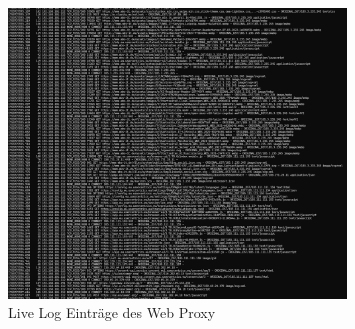 \documentclass[12pt]{scrreprt}
\begin{document}
\begin{thebibliography}{99}
\begin{figure}[htbp]
	\centering
	\includegraphics[width=0.8\textwidth]{squidproxy-log.png}
	\caption{Live Log Einträge des Web Proxy}
	\label{fig:proxylog} %
\end{figure}



	\end{thebibliography}
	\newpage
	
\end{document}

